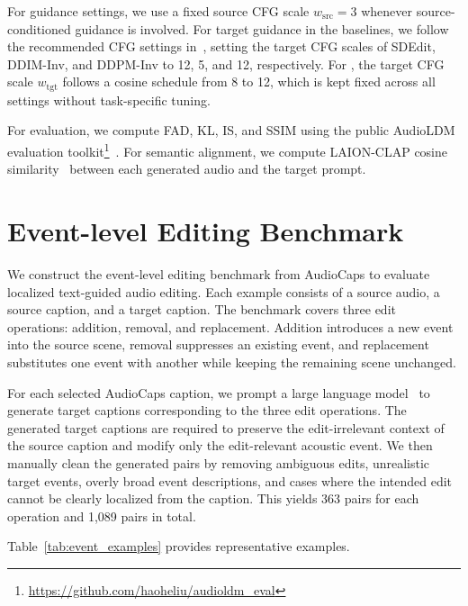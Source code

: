 For guidance settings, we use a fixed source CFG scale $w_{\text{src}}=3$ whenever source-conditioned guidance is involved. 
For target guidance in the baselines, we follow the recommended CFG settings in~\cite{manor2024zero}, setting the target CFG scales of SDEdit, DDIM-Inv, and DDPM-Inv to 12, 5, and 12, respectively. For \ourmethod{}, the target CFG scale $w_{\text{tgt}}$ follows a cosine schedule from 8 to 12, which is kept fixed across all settings without task-specific tuning.

For evaluation, we compute FAD, KL, IS, and SSIM using the public AudioLDM evaluation toolkit\footnote{\url{https://github.com/haoheliu/audioldm_eval}}~\cite{liu2023audioldm,liu2024audioldm}. 
For semantic alignment, we compute LAION-CLAP cosine similarity~\cite{laionclap} between each generated audio and the target prompt.

\section{Event-level Editing Benchmark}
\label{app:event_benchmark}

We construct the event-level editing benchmark from AudioCaps to evaluate localized text-guided audio editing. Each example consists of a source audio, a source caption, and a target caption. The benchmark covers three edit operations: addition, removal, and replacement. Addition introduces a new event into the source scene, removal suppresses an existing event, and replacement substitutes one event with another while keeping the remaining scene unchanged.

For each selected AudioCaps caption, we prompt a large language model~\cite{deepseekai2024deepseekv3technicalreport} to generate target captions corresponding to the three edit operations. The generated target captions are required to preserve the edit-irrelevant context of the source caption and modify only the edit-relevant acoustic event. We then manually clean the generated pairs by removing ambiguous edits, unrealistic target events, overly broad event descriptions, and cases where the intended edit cannot be clearly localized from the caption. This yields 363 pairs for each operation and 1,089 pairs in total.

Table~\ref{tab:event_examples} provides representative examples.

